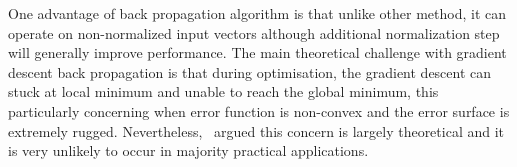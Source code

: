 \par 
One advantage of back propagation algorithm is that unlike other method, it can operate on non-normalized input vectors although additional normalization step will generally improve performance. \cite{Buckland:2002} The main theoretical challenge with gradient descent back propagation is that during optimisation, the gradient descent can stuck at local minimum and unable to reach the global minimum, this particularly concerning when error function is non-convex and the error surface is extremely rugged. Nevertheless,~\citet{LeCun_2015} argued this concern is largely theoretical and it is very unlikely to occur in majority practical applications. 